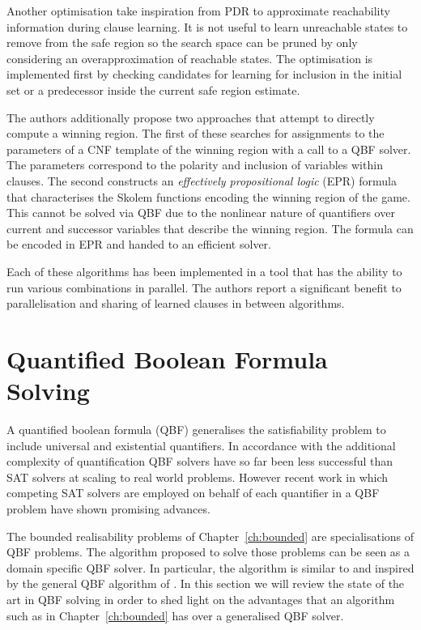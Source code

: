 Another optimisation take inspiration from PDR to approximate reachability information during clause learning. It is not useful to learn unreachable states to remove from the safe region so the search space can be pruned by only considering an overapproximation of reachable states. The optimisation is implemented first by checking candidates for learning for inclusion in the initial set or a predecessor inside the current safe region estimate.

The authors additionally propose two approaches that attempt to directly compute a winning region. The first of these searches for assignments to the parameters of a CNF template of the winning region with a call to a QBF solver. The parameters correspond to the polarity and inclusion of variables within clauses. The second constructs an \emph{effectively propositional logic} (EPR) formula that characterises the Skolem functions encoding the winning region of the game. This cannot be solved via QBF due to the nonlinear nature of quantifiers over current and successor variables that describe the winning region. The formula can be encoded in EPR and handed to an efficient solver.

Each of these algorithms has been implemented in a tool that has the ability to run various combinations in parallel. The authors report a significant benefit to parallelisation and sharing of learned clauses in between algorithms.

\section{Quantified Boolean Formula Solving}

A quantified boolean formula (QBF) generalises the satisfiability problem to include universal and existential quantifiers. In accordance with the additional complexity of quantification QBF solvers have so far been less successful than SAT solvers at scaling to real world problems. However recent work in which competing SAT solvers are employed on behalf of each quantifier in a QBF problem have shown promising advances.

The bounded realisability problems of Chapter~\ref{ch:bounded} are specialisations of QBF problems. The algorithm proposed to solve those problems can be seen as a domain specific QBF solver. In particular, the algorithm is similar to and inspired by the general QBF algorithm of \cite{Janota12}. In this section we will review the state of the art in QBF solving in order to shed light on the advantages that an algorithm such as in Chapter~\ref{ch:bounded} has over a generalised QBF solver.

